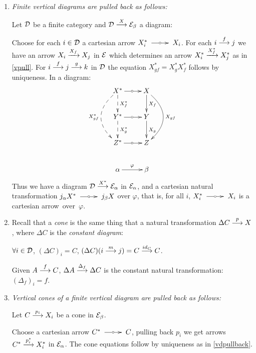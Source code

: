 \begin{sinnadastandard}
\begin{enumerate}
\item \label{vdpullback}
\emph{Finite vertical diagrams are pulled back as follows:} 

Let $\mathcal{D}$ be a finite category and  $\mathcal{D} \overset {X} {\longrightarrow} \mathcal{E}_\beta$ a diagram:  


Choose for each $i \in \mathcal{D}$ a cartesian arrow $X_i^* \tocar X_i$. 
For each $i \overset {f} {\longrightarrow} j$ we have an arrow  $ X_i \xrightarrow{X_f} X_j $ in $\mathcal{E}$ which determines an arrow  $X_i^* \xrightarrow{X_f^*} X_j^*$ as in \ref{vpull}. For $i \overset {f} {\longrightarrow} j \overset {g} {\longrightarrow} k$ in $\mathcal{D}$ the equation 
$X_{gf}^* = X_g^* X_f^*$ follows by uniqueness. In a diagram:
$$
\xymatrix
   {
  & {}
    X^* \ar[r]|\car 
        \ar@{-->}[d]^{X_f^*}
        \ar@{-->}@/_2pc/[dd]_{X_{gf}^*} 
  & X \ar[d]^{X_f}
      \ar@/^2pc/[dd]^{X_{gf}} 
  \\
  & Y^* \ar[r]|\car 
        \ar@{-->}[d]^{X_g^*}  
  & Y %
      \ar[d]^{X_g}
  & {}
  \\ 
  & {} 
    Z^* \ar[r]|\car 
  & Z %
  \\
  & {}
    \alpha \ar[r]^{\varphi} 
  & \beta
   }
$$
Thus we have a diagram $\mathcal{D} \overset {X^*} {\longrightarrow} \mathcal{E}_\alpha$ in 
$\mathcal{E}_\alpha$,  and a cartesian natural transformation 
$j_\alpha X^* \tocar j_\beta X$ over $\varphi$, that is, for all $i$,
$X_i^* \tocar X_i$ is a cartesian \mbox{arrow over $\varphi$.} 

\item  
Recall that a \emph{cone} is the same thing that a natural transformation $\Delta C \overset {p} {\longrightarrow} X$, where $\Delta C$ is the \emph{constant diagram}: 

$\forall i \in \mathcal{D}$, 
$(\Delta C)_i = C$,
$(\Delta C)(i \overset {m} {\longrightarrow} j) = C \overset {id_C} {\longrightarrow} C$. 

Given 
$A \overset {f} {\longrightarrow} C$, $\Delta A \overset {\Delta_f} {\longrightarrow} \Delta C$ is the constant natural transformation: $(\Delta_f)_i = f$.

\item 
\emph{Vertical cones of a finite vertical diagram are pulled back as follows:}

Let $C \overset {p_i} {\longrightarrow} X_i$ be a cone in $\mathcal{E}_\beta$. 

Choose a cartesian arrow $C^* \tocar C$, pulling back $p_i$ we get arrows  
$C^* \overset {p_i^*} {\longrightarrow} X_i^*$ in $\mathcal{E}_\alpha$. The cone equations follow by uniqueness as in \ref{vdpullback}.  
\end{enumerate}
\end{sinnadastandard}
